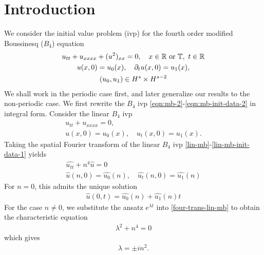 \documentclass[12pt,reqno]{amsart}
\numberwithin{equation}{section}  %
\numberwithin{figure}{section}
\newcommand{\rr}{\mathbb{R}}
\newcommand{\ci}{\mathbb{T}}
\newcommand{\wh}{\widehat}
\newcommand{\p}{\partial}
\theoremstyle{plain}
\theoremstyle{definition}
\theoremstyle{remark}
\begin{document}
\section{Introduction}
%
We consider the initial value problem (ivp) for the fourth order modified Boussinesq
($B_4$) equation 
\begin{gather}
  u_{tt}   + u_{xxxx} + (u^2)_{xx} = 0, \quad x \in \rr \text{ or }
  \ci,\text{ } t \in \rr
  \label{eqn:mb-2}
  \\
  u(x,0) = u_{0}(x), \quad \p_t u(x, 0) = u_1(x), 
  \label{eqn:mb-init-data-2}
  \\
  \notag
  (u_0, u_1) \in
  H^{s}\times
  H^{s-2}
\end{gather}
%
%
We shall work in the periodic case first, and later generalize our results to
the non-periodic case. We first rewrite the $B_4$ ivp
\eqref{eqn:mb-2}-\eqref{eqn:mb-init-data-2} in integral form. 
Consider
the linear $B_4$ ivp
\begin{gather}
  u_{tt} + u_{xxxx} = 0,
  \label{lin-mb}
  \\
  u(x, 0)=u_{0}(x), \quad u_{t}(x,0) = u_{1}(x).
  \label{lin-mb-init-data-1}
\end{gather}
Taking the spatial Fourier transform of the linear $B_{4}$ ivp
\eqref{lin-mb}-\eqref{lin-mb-init-data-1} yields
%
%
\begin{gather}
  \wh{u_{tt}} + n^{4} \wh{u} = 0
  \label{four-trans-lin-mb}
  \\
  \wh{u}(n, 0) = \wh{u_{0}}(n), \quad \wh{u_{t}}(n, 0) = \wh{u_{1}}(n)
  \label{four-trans-lin-mb-data}
\end{gather}
For $n=0$, this admits the unique solution
%
%
\begin{equation*}
\begin{split}
  \wh{u}(0,t) = \wh{u_{0}}(n) + \wh{u_{1}}(n)t
\end{split}
\end{equation*}
%
%
For the case $n \neq 0$, we substitute the ansatz $e^{\lambda t}$ into
\eqref{four-trans-lin-mb} to obtain the characteristic equation
%
%
\begin{equation*}
\begin{split}
  \lambda^{2} + n^{4} = 0
\end{split}
\end{equation*}
%
%
which gives 
%
%
\begin{equation*}
\begin{split}
  \lambda = \pm in^{2}.
\end{split}
\end{equation*}
\end{document}
